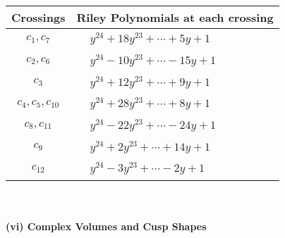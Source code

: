 \documentclass[1p]{elsarticle_modified}
\theoremstyle{definition}
\begin{document}
\begin{tabular}{m{50pt}|m{274pt}}
Crossings & \hspace{64pt}Riley Polynomials at each crossing \\
\hline $$\begin{aligned}c_{1},c_{7}\end{aligned}$$&$\begin{aligned}
&y^{24}+18 y^{23}+\cdots+5 y+1
\end{aligned}$\\
\hline $$\begin{aligned}c_{2},c_{6}\end{aligned}$$&$\begin{aligned}
&y^{24}-10 y^{23}+\cdots-15 y+1
\end{aligned}$\\
\hline $$\begin{aligned}c_{3}\end{aligned}$$&$\begin{aligned}
&y^{24}+12 y^{23}+\cdots+9 y+1
\end{aligned}$\\
\hline $$\begin{aligned}c_{4},c_{5},c_{10}\end{aligned}$$&$\begin{aligned}
&y^{24}+28 y^{23}+\cdots+8 y+1
\end{aligned}$\\
\hline $$\begin{aligned}c_{8},c_{11}\end{aligned}$$&$\begin{aligned}
&y^{24}-22 y^{23}+\cdots-24 y+1
\end{aligned}$\\
\hline $$\begin{aligned}c_{9}\end{aligned}$$&$\begin{aligned}
&y^{24}+2 y^{23}+\cdots+14 y+1
\end{aligned}$\\
\hline $$\begin{aligned}c_{12}\end{aligned}$$&$\begin{aligned}
&y^{24}-3 y^{23}+\cdots-2 y+1
\end{aligned}$\\
\hline
\end{tabular}\\~\\
\newpage\flushleft \textbf{(vi) Complex Volumes and Cusp Shapes}
\end{document}
